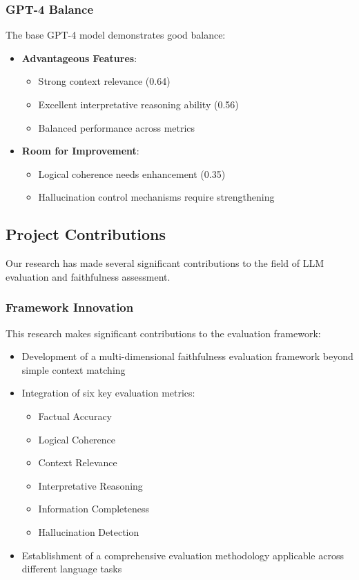\subsubsection{GPT-4 Balance}
The base GPT-4 model demonstrates good balance:
\begin{itemize}
    \item \textbf{Advantageous Features}:
    \begin{itemize}
        \item Strong context relevance (0.64)
        \item Excellent interpretative reasoning ability (0.56)
        \item Balanced performance across metrics
    \end{itemize}
    \item \textbf{Room for Improvement}:
    \begin{itemize}
        \item Logical coherence needs enhancement (0.35)
        \item Hallucination control mechanisms require strengthening
    \end{itemize}
\end{itemize}

\subsection{Project Contributions}
Our research has made several significant contributions to the field of LLM evaluation and faithfulness assessment.

\subsubsection{Framework Innovation}
This research makes significant contributions to the evaluation framework:
\begin{itemize}
    \item Development of a multi-dimensional faithfulness evaluation framework beyond simple context matching
    \item Integration of six key evaluation metrics:
    \begin{itemize}
        \item Factual Accuracy
        \item Logical Coherence
        \item Context Relevance
        \item Interpretative Reasoning
        \item Information Completeness
        \item Hallucination Detection
    \end{itemize}
    \item Establishment of a comprehensive evaluation methodology applicable across different language tasks
\end{itemize}


